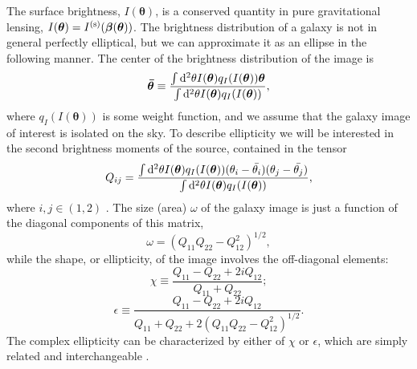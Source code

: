 The surface brightness, $I(\bm{\theta})$, is a conserved quantity in pure gravitational lensing, $I(\bm{\theta}) = I^{({\rm s})}(\bm{\beta}(\bm{\theta}))$. The brightness distribution of a galaxy is not in general perfectly elliptical, but we can approximate it as an ellipse in the following manner. The center of the brightness distribution of the image is
\begin{equation}
\bm{\bar{\theta}} \equiv \frac{\int {\rm d}^2\theta I(\bm{\theta}) q_I( I(\bm{\theta})) \bm{\theta}}{\int {\rm d}^2\theta I(\bm{\theta}) q_I( I(\bm{\theta}))},
\end{equation}
where $q_I( I(\bm{\theta}))$ is some weight function, and we assume that the galaxy image of interest is isolated on the sky. To describe ellipticity we will be interested in the second brightness moments of the source, contained in the tensor
\begin{equation}
Q_{ij} = \frac{\int {\rm d}^2\theta I(\bm{\theta}) q_I( I(\bm{\theta})) (\theta_i - \bar{\theta_i})(\theta_j - \bar{\theta_j})}{\int {\rm d}^2\theta I(\bm{\theta}) q_I( I(\bm{\theta}))},
\end{equation}
where $i,j \in (1,2)$ \citep{Schneider06_WeakGravLens}. The size (area) $\omega$ of the galaxy image is just a function of the diagonal components of this matrix,
\begin{equation} 
\label{eqn:size}
\omega = (Q_{11}Q_{22} - Q_{12}^2)^{1/2},
\end{equation}
while the shape, or ellipticity, of the image involves the off-diagonal elements:
\begin{equation} 
\chi \equiv \frac{Q_{11} - Q_{22} + 2i Q_{12}}{Q_{11} + Q_{22}};
\end{equation}
\begin{equation} 
\epsilon \equiv \frac{Q_{11} - Q_{22} + 2i Q_{12}}{Q_{11} + Q_{22} + 2(Q_{11}Q_{22} - Q_{12}^2)^{1/2}}.
\end{equation}
The complex ellipticity can be characterized by either of $\chi$ or $\epsilon$, which are simply related and interchangeable \citep[in different situations one may be easier to work with,][]{BS01}. 

